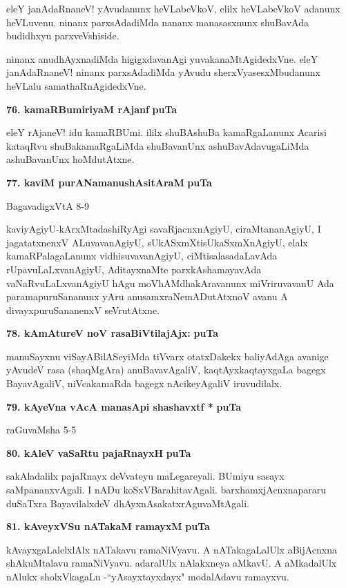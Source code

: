 eleY janAdaRnaneV! yAvudanunx heVLabeVkoV, elilx heVLabeVkoV adanunx heVLuvenu. ninanx parxsAdadiMda nananx manasasxnunx shuBavAda budidhxyu parxveVshiside.

\eject

ninanx anudhAyxnadiMda higigxdavanAgi yuvakanaMtAgidedxVne. eleY janAdaRnaneV! ninanx parxsAdadiMda yAvudu sherxVyasesxMbudanunx heVLalu samathaRnAgidedxVne.

\medskip
\noindent
\textbf{76. kamaRBumiriyaM rAjanf} \hfill{\bf puTa \pageref{90f}}

\smallskip
eleY rAjaneV! idu kamaRBUmi. ililx shuBAshuBa kamaRgaLanunx Acarisi kataqRvu shuBakamaRgaLiMda shuBavanUnx ashuBavAdavugaLiMda ashuBavanUnx hoMdutAtxne.

\medskip
\noindent
\textbf{77. kaviM purANamanushAsitAraM} \hfill{\bf puTa \pageref{239}}

\hfill{BagavadigxVtA 8-9}

\smallskip
kaviyAgiyU-kArxMtadashiRyAgi savaRjacnxnAgiyU, ciraMtananAgiyU, I jagatatxnenxV ALuvavanAgiyU, sUkASxmXtisUkaSxmXnAgiyU, elalx kamaRPalagaLanunx vidhisuvavanAgiyU, ciMtisalasadaLavAda rUpavuLaLxvanAgiyU, AditayxnaMte parxkAshamayavAda vaNaRvuLaLxvanAgiyU hAgu moVhAMdhakAravanunx miVriruvavanU Ada paramapuruSananunx yAru anusamxraNemADutAtxnoV avanu A divayxpuruSananenxV seVrutAtxne.


\medskip
\noindent
\textbf{78. kAmAtureV noV rasaBiVtilajAjx:} \hfill{\bf puTa \pageref{222}}

\smallskip
manuSayxnu viSayABilASeyiMda tiVvarx otatxDakekx baliyAdAga avanige yAvudeV rasa (shaqMgAra) anuBavavAgaliV, kaqtAyxkaqtayxgaLa bagegx BayavAgaliV, niVcakamaRda bagegx nAcikeyAgaliV iruvudilalx.


\smallskip
\noindent
\textbf{79. kAyeVna vAcA manasApi shashavxtf *} \hfill{\bf puTa \pageref{56}}

\hfill{raGuvaMsha 5-5}

\medskip
\noindent
\textbf{80. kAleV vaSaRtu pajaRnayxH} \hfill{\bf puTa \pageref{63c}}

\smallskip
sakAladalilx pajaRnayx deVvateyu maLegareyali. BUmiyu sasayx saMpananxvAgali. I nADu koSxVBarahitavAgali. barxhamxjAcnxnapararu duSaTxra BayavilalxdeV dhAyxnAsakatxrAguvaMtAgali.

\medskip
\noindent
\textbf{81. kAveyxVSu nATakaM ramayxM} \hfill{\bf puTa \pageref{233a}}

\smallskip
kAvayxgaLalelxlAlx nATakavu ramaNiVyavu. A nATakagaLalUlx aBijAcnxna shAkuMtalavu ramaNiVyavu. adaralUlx nAlakxneya aMkavU. A aMkadalUlx nAlukx sholxVkagaLu -``yAsayxtayxdayx" modalAdavu ramayxvu.

